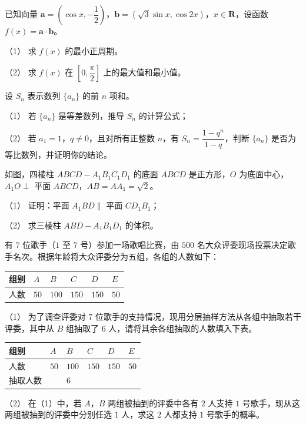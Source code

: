 \begin{question}
已知向量 $\boldsymbol a=\left(\cos x,-\dfrac12\right)$，$\boldsymbol b=\left(\sqrt3\sin x,\cos2x\right)$，$x\in\mathbf R$，设函数 $f(x)=\boldsymbol a\cdot\boldsymbol b$。

（1） 求 $f(x)$ 的最小正周期。

（2） 求 $f(x)$ 在 $\left[0,\dfrac\pi2\right]$ 上的最大值和最小值。

\end{question}
\begin{question}
设 $S_n$ 表示数列 $\{a_n\}$ 的前 $n$ 项和。

（1） 若 $\{a_n\}$ 是等差数列，推导 $S_n$ 的计算公式；

（2） 若 $a_1=1$，$q\ne0$，且对所有正整数 $n$，有 $S_n=\dfrac{1-q^n}{1-q}$，判断 $\{a_n\}$ 是否为等比数列，并证明你的结论。

\Needspace{0.4\textheight}
\end{question}
\begin{question}
如图，四棱柱 $ABCD-A_1B_1C_1D_1$ 的底面 $ABCD$ 是正方形，$O$ 为底面中心，$A_1O\perp$ 平面 $ABCD$，$AB=AA_1=\sqrt2$。

（1） 证明：平面 $A_1BD\parallel$ 平面 $CD_1B_1$；

（2） 求三棱柱 $ABD-A_1B_1D_1$ 的体积。
\nopagebreak[4]
\begin{center}\end{center}
\nopagebreak[4]
\end{question}
\begin{question}
有 $7$ 位歌手（$1$ 至 $7$ 号）参加一场歌唱比赛，由 $500$ 名大众评委现场投票决定歌手名次。根据年龄将大众评委分为五组，各组的人数如下：

\begin{center}
\begin{tabular}{llllll}
\toprule
组别 & $A$ & $B$ & $C$ & $D$ & $E$ \\
\midrule
人数 & $50$ & $100$ & $150$ & $150$ & $50$ \\
\bottomrule
\end{tabular}
\end{center}

（1） 为了调查评委对 $7$ 位歌手的支持情况，现用分层抽样方法从各组中抽取若干评委，其中从 $B$ 组抽取了 $6$ 人，请将其余各组抽取的人数填入下表。

\begin{center}
\begin{tabular}{llllll}
\toprule
组别 & $A$ & $B$ & $C$ & $D$ & $E$ \\
\midrule
人数 & $50$ & $100$ & $150$ & $150$ & $50$ \\
抽取人数 &  & $6$ &  &  &  \\
\bottomrule
\end{tabular}
\end{center}

（2） 在（1）中，若 $A$，$B$ 两组被抽到的评委中各有 $2$ 人支持 $1$ 号歌手，现从这两组被抽到的评委中分别任选 $1$ 人，求这 $2$ 人都支持 $1$ 号歌手的概率。

\end{question}
